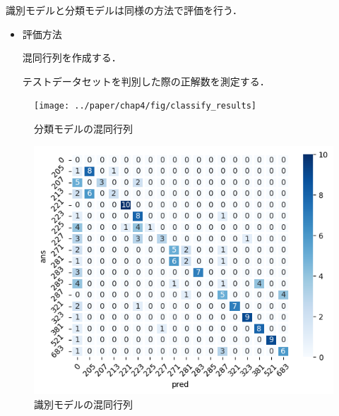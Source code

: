 識別モデルと分類モデルは同様の方法で評価を行う．
\begin{itemize}
	\item 評価方法
	
	混同行列を作成する．
	
	テストデータセットを判別した際の正解数を測定する．
	
	

\end{itemize}
\newpage
\begin{figure}[htbp]
	\begin{minipage}[b]{0.5\linewidth}
		\centering
		\texttt{[image: ../paper/chap4/fig/classify\_results]}
		\caption{分類モデルの混同行列}
	\end{minipage}
  \begin{minipage}[b]{0.5\linewidth}
 	\centering
  	\includegraphics[width=\linewidth]{../paper/chap4/fig/predicted_results}
  	\caption{識別モデルの混同行列}
  \end{minipage}
\end{figure}



